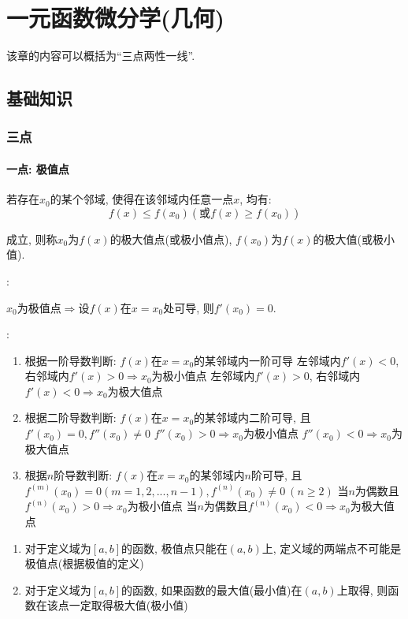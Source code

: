 \chapter{一元函数微分学(几何)}
该章的内容可以概括为``三点两性一线''.
\section{基础知识}
\subsection{三点}
\subsubsection{一点: 极值点}
若存在$ x_{0} $的某个邻域, 使得在该邻域内任意一点$ x $, 均有:
\begin{equation*}
f(x)\le f(x_{0})(\text{或}f(x)\ge f(x_{0}))
\end{equation*}\par
成立, 则称$ x_{0} $为$ f(x) $的极大值点(或极小值点), $ f(x_{0}) $为$ f(x) $的极大值(或极小值).\par \vspace{.5em}
:\par \vspace{.5em}
$ x_{0} $为极值点$ \Rightarrow $设$ f(x) $在$ x=x_{0} $处可导, 则$ f'(x_{0})=0 $.\par \vspace{.5em}
:
\begin{enumerate}
\item 根据一阶导数判断: $ f(x) $在$ x=x_{0} $的某邻域内一阶可导
\subitem 左邻域内$ f'(x)<0 $, 右邻域内$ f'(x)>0\Rightarrow x_{0} $为极小值点
\subitem 左邻域内$ f'(x)>0 $, 右邻域内$ f'(x)<0\Rightarrow x_{0} $为极大值点
\item 根据二阶导数判断: $ f(x) $在$ x=x_{0} $的某邻域内二阶可导, 且$ f'(x_{0})=0, f''(x_{0})\neq 0 $
\subitem $ f''(x_{0})>0\Rightarrow x_{0} $为极小值点
\subitem $ f''(x_{0})<0\Rightarrow x_{0} $为极大值点
\item 根据$ n $阶导数判断: $ f(x) $在$ x=x_{0} $的某邻域内$ n $阶可导, 且$ f^{(m)}(x_{0})=0(m=1,2,...,n-1), f^{(n)}(x_{0})\neq 0\ (n\ge 2) $
\subitem 当$ n $为偶数且$ f^{(n)}(x_{0})>0\Rightarrow x_{0} $为极小值点
\subitem 当$ n $为偶数且$ f^{(n)}(x_{0})<0\Rightarrow x_{0} $为极大值点
\end{enumerate}
\begin{tcolorbox}
\begin{enumerate}
\item 对于定义域为$ [a,b] $的函数, 极值点只能在$ (a,b) $上, 定义域的两端点不可能是极值点(根据极值的定义)
\item 对于定义域为$ [a,b] $的函数, 如果函数的最大值(最小值)在$ (a,b) $上取得, 则函数在该点一定取得极大值(极小值)
\end{enumerate}
\end{tcolorbox}
